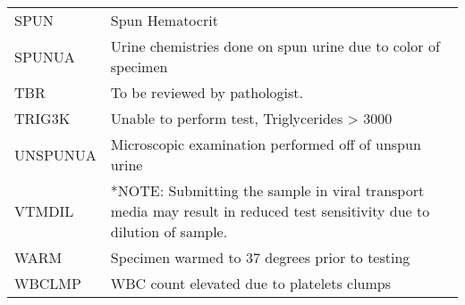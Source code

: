 \begin{fullwidth}
\begin{longtable}{p{.20\linewidth} p{.75\linewidth}}
SPUN        & Spun Hematocrit                                                                                                                                                                                                                                                                              \\
SPUNUA      & Urine chemistries done on spun urine due to color of specimen                                                                                                                                                                                                                                \\
TBR         & To be reviewed by pathologist.                                                                                                                                                                                                                                                               \\
TRIG3K      & Unable to perform test, Triglycerides > 3000                                                                                                                                                                                                                                                 \\
UNSPUNUA    & Microscopic examination performed off of unspun urine                                                                                                                                                                                                                                        \\
VTMDIL      & *NOTE: Submitting the sample in viral transport media may result in reduced test sensitivity due to dilution of sample.                                                                                                                                                                      \\
WARM        & Specimen warmed to 37 degrees prior to testing                                                                                                                                                                                                                                               \\
WBCLMP      & WBC count elevated due to platelets clumps                                                                                                                                                                                                                                                   \\

\end{longtable}
\end{fullwidth}

